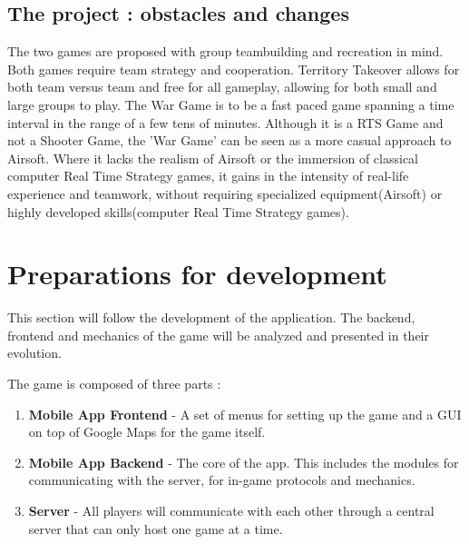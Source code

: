 \documentclass{article}
\begin{document}
\subsection{The project : obstacles and changes}
The two games are proposed with group teambuilding and recreation in mind. Both
games require team strategy and cooperation. Territory Takeover allows for both
team versus team and free for all gameplay, allowing for both small and large
groups to play. The War Game is to be a fast paced game spanning a time interval
in the range of a few tens of minutes. Although it is a RTS Game and not a
Shooter Game, the 'War Game' can be seen as a more casual approach to Airsoft.
Where it lacks the realism of Airsoft or the immersion of classical computer
Real Time Strategy games, it gains in the intensity of real-life experience and
teamwork, without requiring specialized equipment(Airsoft) or highly developed
skills(computer Real Time Strategy games).





















\section{Preparations for development}

This section will follow the development of the application. The backend,
frontend and mechanics of the game will be analyzed and presented in their
evolution. \newline

The game is composed of three parts : \newline
\begin{enumerate}
  \item \textbf{Mobile App Frontend} - A set of menus for setting up the game
  and a GUI on top of Google Maps for the game itself.
  \item \textbf{Mobile App Backend} - The core of the app. This includes the
  modules for communicating with the server, for in-game protocols and
  mechanics.
  \item \textbf{Server} - All players will communicate with each other through a
  central server that can only host one game at a time.  
\end{enumerate}
\end{document}
